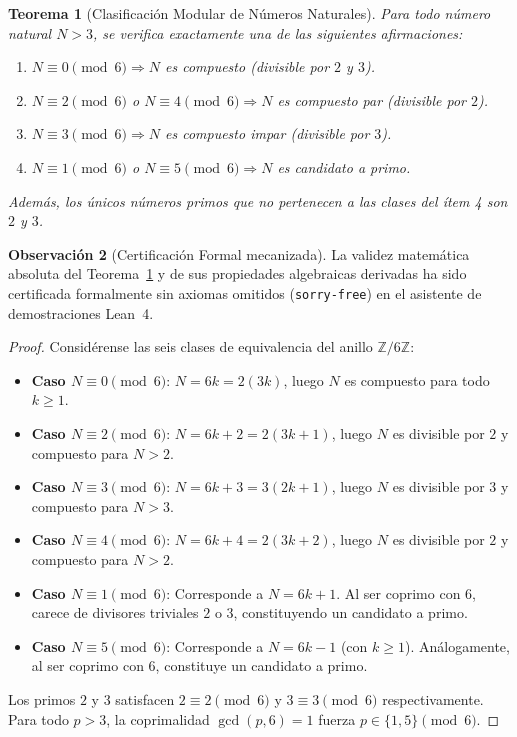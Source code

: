 \documentclass{article}
\numberwithin{equation}{section}
\newcommand{\ZZ}{\mathbb{Z}}
\theoremstyle{plain}
\newtheorem{theorem}{Teorema}[section]
\theoremstyle{definition}
\newtheorem{remark}[theorem]{Observación}
\begin{document}
\begin{theorem}[Clasificación Modular de Números Naturales]
\label{thm:clasificacion-modular}
Para todo número natural $N > 3$, se verifica exactamente una de las siguientes afirmaciones:
\begin{enumerate}
    \item $N \equiv 0 \pmod{6} \Rightarrow N$ es compuesto (divisible por $2$ y $3$).
    \item $N \equiv 2 \pmod{6}$ o $N \equiv 4 \pmod{6} \Rightarrow N$ es compuesto par (divisible por $2$).
    \item $N \equiv 3 \pmod{6} \Rightarrow N$ es compuesto impar (divisible por $3$).
    \item $N \equiv 1 \pmod{6}$ o $N \equiv 5 \pmod{6} \Rightarrow N$ es candidato a primo.
\end{enumerate}
Además, los únicos números primos que no pertenecen a las clases del ítem 4 son $2$ y $3$.
\end{theorem}

\begin{remark}[Certificación Formal mecanizada]
La validez matemática absoluta del Teorema~\ref{thm:clasificacion-modular} y de sus propiedades algebraicas derivadas ha sido certificada formalmente sin axiomas omitidos (\texttt{sorry-free}) en el asistente de demostraciones Lean~4.
\end{remark}

\begin{proof}
Considérense las seis clases de equivalencia del anillo $\ZZ/6\ZZ$:
\begin{itemize}
    \item \textbf{Caso $N \equiv 0 \pmod{6}$}: $N = 6k = 2(3k)$, luego $N$ es compuesto para todo $k \ge 1$.
    \item \textbf{Caso $N \equiv 2 \pmod{6}$}: $N = 6k + 2 = 2(3k + 1)$, luego $N$ es divisible por $2$ y compuesto para $N > 2$.
    \item \textbf{Caso $N \equiv 3 \pmod{6}$}: $N = 6k + 3 = 3(2k + 1)$, luego $N$ es divisible por $3$ y compuesto para $N > 3$.
    \item \textbf{Caso $N \equiv 4 \pmod{6}$}: $N = 6k + 4 = 2(3k + 2)$, luego $N$ es divisible por $2$ y compuesto para $N > 2$.
    \item \textbf{Caso $N \equiv 1 \pmod{6}$}: Corresponde a $N = 6k + 1$. Al ser coprimo con $6$, carece de divisores triviales $2$ o $3$, constituyendo un candidato a primo.
    \item \textbf{Caso $N \equiv 5 \pmod{6}$}: Corresponde a $N = 6k - 1$ (con $k \ge 1$). Análogamente, al ser coprimo con $6$, constituye un candidato a primo.
\end{itemize}
Los primos $2$ y $3$ satisfacen $2 \equiv 2 \pmod{6}$ y $3 \equiv 3 \pmod{6}$ respectivamente. Para todo $p > 3$, la coprimalidad $\gcd(p, 6) = 1$ fuerza $p \in \{1, 5\} \pmod{6}$.
\end{proof}
\end{document}
